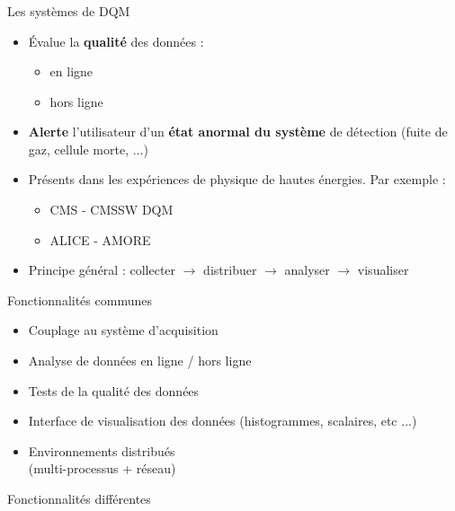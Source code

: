 \documentclass[8pt]{beamer}
\begin{document}
  \begin{frame}
  \frametitle{\secname}
  \framesubtitle{\subsecname}
  \small
    \begin{block}{Les systèmes de DQM}
      \begin{itemize}
        \item Évalue la \textbf{qualité} des données :
        \begin{itemize}
          \item en ligne
          \item hors ligne
        \end{itemize}
        \item \textbf{Alerte} l'utilisateur d'un \textbf{état anormal du système} de détection (fuite de gaz, cellule morte, ...)
        \item Présents dans les expériences de physique de hautes énergies. Par exemple :
        \begin{itemize}
          \item CMS   - CMSSW DQM
          \item ALICE - AMORE
        \end{itemize}
        \item Principe général : collecter $\rightarrow$ distribuer $\rightarrow$ analyser $\rightarrow$ visualiser
      \end{itemize}
    \end{block}
    \pause
    \begin{minipage}{0.47\linewidth}
      \begin{block}{Fonctionnalités communes}
        \begin{itemize}
          \item Couplage au système d'acquisition
          \item Analyse de données en ligne / hors ligne
          \item Tests de la qualité des données
          \item Interface de visualisation des données (histogrammes, scalaires, etc ...)
          \item Environnements distribués \\(multi-processus + réseau)
        \end{itemize}
      \end{block}
    \end{minipage} \hfill
    \begin{minipage}{0.47\linewidth}
      \pause
      \begin{block}{Fonctionnalités différentes}

\end{block}
\end{minipage}
\end{frame}
\end{document}
